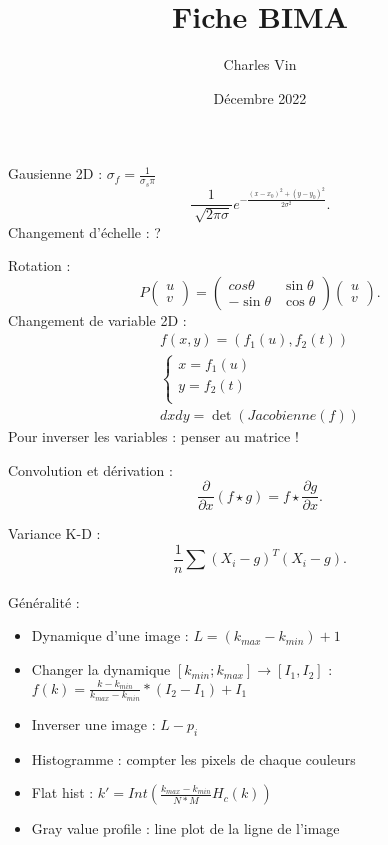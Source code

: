 \documentclass{article}
\title{Fiche BIMA}
\author{Charles Vin}
\date{Décembre 2022}
\theoremstyle{plain}%
\theoremstyle{definition}
\theoremstyle{remark}
\begin{document}
\maketitle
\tableofcontents

Gausienne 2D : $ \sigma _f = \frac{1}{\sigma _s \pi } $ 
\[
    \frac{1}{\sqrt[]{2 \pi \sigma }} e^{- \frac{(x-x_0)^2 + (y-y_0)^2}{2 \sigma ^2}}
.\]
Changement d'échelle : ?

Rotation : 
\[
    P \begin{pmatrix}
        u \\
        v
    \end{pmatrix} = \begin{pmatrix}
        cos \theta & \sin \theta \\
        - \sin \theta & \cos \theta 
    \end{pmatrix} \begin{pmatrix}
        u \\
        v
    \end{pmatrix}
.\]
Changement de variable 2D : \begin{align*}
    f(x,y) = (f_1(u), f_2(t)) \\
    \begin{cases}
    x = f_1(u)\\
    y = f_2(t)\\
    \end{cases} \\
    dxdy = \det (Jacobienne(f))
\end{align*}
Pour inverser les variables : penser au matrice ! 

Convolution et dérivation : 
\[
    \frac{\partial }{\partial x}(f \star g) = f \star \frac{\partial g}{\partial x}
.\]

Variance K-D : 
\[
    \frac{1}{n} \sum_{}^{}(X_i - g)^T (X_i - g)
.\]

Généralité : 
\begin{itemize}
    \item Dynamique d'une image : $ L = (k_{max} - k_{min}) + 1 $ 
    \item Changer la dynamique $ [k_{min};k_{max}] \to [I_1, I_2] $  : $ f(k) = \frac{k - k_{min}}{k_{max} - k_{min}} * (I_2 - I_1) + I_1 $ 
    \item Inverser une image : $ L - p_i $ 
    \item Histogramme : compter les pixels de chaque couleurs
    \item Flat hist : $ k' = Int(\frac{k_{max} - k_{min}}{N*M}H_c(k)) $ 
    \item Gray value profile : line plot de la ligne de l'image
\end{itemize}
\end{document}
